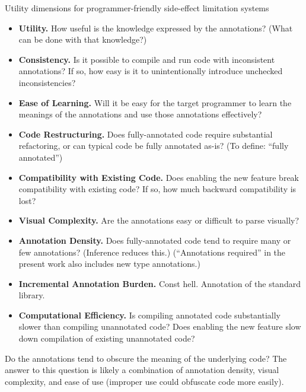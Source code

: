 \documentclass[letterpaper,11pt]{article}
\theoremstyle{definition}
\theoremstyle{remark}
\begin{document}
Utility dimensions for programmer-friendly side-effect limitation systems
\begin{itemize}
\item{\bf Utility.} How useful is the knowledge expressed by the annotations? (What can be done with that knowledge?)

\item {\bf Consistency.} Is it possible to compile and run code with inconsistent annotations? If so, how easy is it to unintentionally introduce unchecked inconsistencies?

\item {\bf Ease of Learning.} Will it be easy for the target programmer to learn the meanings of the annotations and use those annotations effectively?

\item {\bf Code Restructuring.} Does fully-annotated code require substantial refactoring, or can typical code be fully annotated as-is? (To define: ``fully annotated'')

\item{\bf Compatibility with Existing Code.} Does enabling the new feature break compatibility with existing code? If so, how much backward compatibility is lost?

\item {\bf Visual Complexity.} Are the annotations easy or difficult to parse visually?

\item {\bf Annotation Density.} Does fully-annotated code tend to require many or few annotations? (Inference reduces this.) (``Annotations required'' in the present work also includes new type annotations.)

\item {\bf Incremental Annotation Burden.} Const hell. Annotation of the standard library.

\item{\bf Computational Efficiency.} Is compiling annotated code substantially slower than compiling unannotated code? Does enabling the new feature slow down compilation of existing unannotated code?

\end{itemize}

Do the annotations tend to obscure the meaning of the underlying code?
The answer to this question is likely a combination of annotation density, visual complexity, and ease of use (improper use could obfuscate code more easily).
\end{document}
